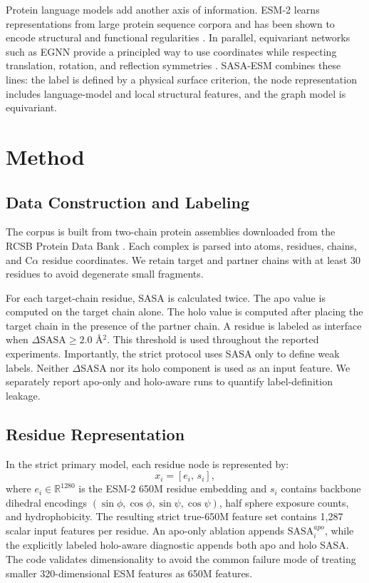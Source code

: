 \documentclass[runningheads]{llncs}
\begin{document}
Protein language models add another axis of information. ESM-2 learns representations
from large protein sequence corpora and has been shown to encode structural and
functional regularities \cite{lin2023esm}. In parallel, equivariant networks such as
EGNN provide a principled way to use coordinates while respecting translation, rotation,
and reflection symmetries \cite{satorras2021egnn}. SASA-ESM combines these lines: the
label is defined by a physical surface criterion, the node representation includes
language-model and local structural features, and the graph model is equivariant.

\section{Method}

\subsection{Data Construction and Labeling}

The corpus is built from two-chain protein assemblies downloaded from the RCSB Protein
Data Bank \cite{berman2000pdb}. Each complex is parsed into atoms, residues, chains, and
C\(\alpha\) residue coordinates. We retain target and partner chains with at least 30
residues to avoid degenerate small fragments.

For each target-chain residue, SASA is calculated twice. The apo value is computed on the
target chain alone. The holo value is computed after placing the target chain in the
presence of the partner chain. A residue is labeled as interface when
\(\Delta\mathrm{SASA}\ge 2.0\) \AA\({}^2\). This threshold is used throughout the
reported experiments. Importantly, the strict protocol uses SASA only to define weak
labels. Neither \(\Delta\)SASA nor its holo component is used as an input feature. We
separately report apo-only and holo-aware runs to quantify label-definition leakage.

\subsection{Residue Representation}

In the strict primary model, each residue node is represented by:
\[
  x_i = [e_i,\,s_i],
\]
where \(e_i\in\mathbb{R}^{1280}\) is the ESM-2 650M residue embedding and \(s_i\)
contains backbone dihedral encodings \((\sin\phi,\cos\phi,\sin\psi,\cos\psi)\), half
sphere exposure counts, and hydrophobicity. The resulting strict true-650M feature set
contains 1,287 scalar input features per residue. An apo-only ablation appends
\(\mathrm{SASA}^{apo}_i\), while the explicitly labeled holo-aware diagnostic appends
both apo and holo SASA. The code validates dimensionality to avoid
the common failure mode of treating smaller 320-dimensional ESM features as 650M
features.
\end{document}
